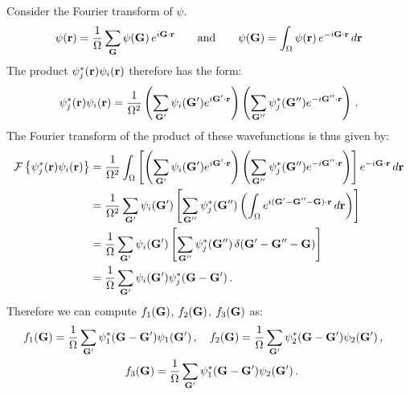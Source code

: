 Consider the Fourier transform of $\psi$.
\begin{align}
    \psi(\mathbf{r}) = \frac{1}{\Omega}\sum_{\mathbf{G}} \psi(\mathbf{G})\, e^{i\mathbf{G}\cdot\mathbf{r}} \quad \quad \text{and} \quad \quad
    \psi(\mathbf{G}) = \int_\Omega \psi(\mathbf{r})\, e^{-i\mathbf{G}\cdot\mathbf{r}} \, d\mathbf{r}
\end{align}
The product $\psi_j^*(\mathbf{r})\psi_i(\mathbf{r})$ therefore has the form:
\begin{align}
    \psi_j^*(\mathbf{r})\psi_i(\mathbf{r}) = \frac{1}{\Omega^2}\left( \sum_{\mathbf{G}'} \psi_i(\mathbf{G}') e^{i\mathbf{G}'\cdot\mathbf{r}} \right)
    \left( \sum_{\mathbf{G}''} \psi_j^*(\mathbf{G}'') e^{-i\mathbf{G}''\cdot\mathbf{r}} \right) \, .
\end{align}
The Fourier transform of the product of these wavefunctions is thus given by:
\begin{align}
    \mathcal{F}\left\{ \psi_j^*(\mathbf{r})\psi_i(\mathbf{r}) \right\} &= \frac{1}{\Omega^2}
    \int_\Omega \left[ \left( \sum_{\mathbf{G}'} \psi_i(\mathbf{G}') e^{i\mathbf{G}'\cdot\mathbf{r}} \right)
    \left( \sum_{\mathbf{G}''} \psi_j^*(\mathbf{G}'') e^{-i\mathbf{G}''\cdot\mathbf{r}} \right) \right]
    e^{-i\mathbf{G}\cdot\mathbf{r}} \, d\mathbf{r} \nonumber \\
    &= \frac{1}{\Omega^2} \sum_{\mathbf{G}'} \psi_i(\mathbf{G}') \left[ \sum_{\mathbf{G}''} \psi_j^*(\mathbf{G}'') \left(
    \int_\Omega e^{i(\mathbf{G}'-\mathbf{G}''-\mathbf{G})\cdot\mathbf{r}} \, d\mathbf{r} \right) \right] \nonumber \\
    &= \frac{1}{\Omega} \sum_{\mathbf{G}'} \psi_i(\mathbf{G}') \left[ \sum_{\mathbf{G}''} \psi_j^*(\mathbf{G}'')
    \, \delta(\mathbf{G}'-\mathbf{G}''-\mathbf{G}) \right] \nonumber \\
    &= \frac{1}{\Omega} \sum_{\mathbf{G}'} \psi_i(\mathbf{G}') \psi_j^*(\mathbf{G}-\mathbf{G}') \, .
\end{align}
Therefore we can compute $f_1(\mathbf{G})$, $f_2(\mathbf{G})$, $f_3(\mathbf{G})$ as:
\begin{align}
    f_1(\bG) = \frac{1}{\Omega} \sum_{\bG'} \psi_1^* (\bG-\bG') \psi_1(\bG') \, , \quad
    f_2(\bG) = \frac{1}{\Omega} \sum_{\bG'} \psi_2^* (\bG-\bG') \psi_2(\bG') \, , \quad \nonumber\\
    f_3(\bG) = \frac{1}{\Omega} \sum_{\bG'} \psi_1^* (\bG-\bG') \psi_2(\bG') \, .
    \hspace{3cm} \label{eq:fG}
\end{align}
